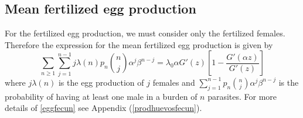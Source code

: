 \documentclass[12pt,a4paper]{article}
\theoremstyle{plain}%
\theoremstyle{definition}
\theoremstyle{remark}
\begin{document}
	\subsection{Mean fertilized egg production}
	For the fertilized egg production, we must consider only the fertilized females. Therefore the expression for the mean fertilized egg production is given by
	\begin{equation}\label{eggfecun}
	\sum_{n\geq 1}\sum_{j=1}^{n-1}j\lambda(n)p_n\binom{n}{j}\alpha^j\beta^{n-j}=
	\lambda_0 \alpha G'(z) \left[1-\frac{ G'(\alpha z)}{G'(z)}\right]  
	\end{equation}
	where
	$j\lambda(n)$ is the egg production of $j$ females and $\sum_{j=1}^{n-1} p_n\binom{n}{j}\alpha^j\beta^{n-j}$ is the probability 
	of having at least one male in a burden of $n$ parasites.
	For more details of \eqref{eggfecun} see Appendix (\ref{prodhuevosfecun}).
	
	
	
	
	
	
	
\end{document}
